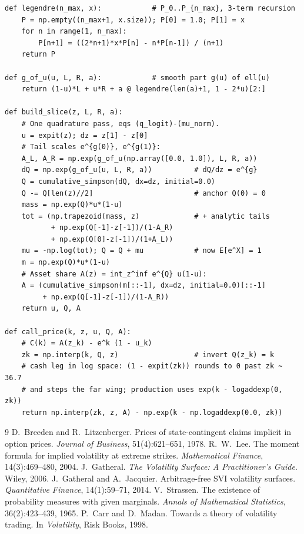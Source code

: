 \documentclass[11pt]{article}
\begin{document}
\begin{lstlisting}[caption={The LQD quadrature pipeline (distilled from
\texttt{models/lqd/\{basis,quadrature\}.py}).}]
def legendre(n_max, x):            # P_0..P_{n_max}, 3-term recursion
    P = np.empty((n_max+1, x.size)); P[0] = 1.0; P[1] = x
    for n in range(1, n_max):
        P[n+1] = ((2*n+1)*x*P[n] - n*P[n-1]) / (n+1)
    return P

def g_of_u(u, L, R, a):            # smooth part g(u) of ell(u)
    return (1-u)*L + u*R + a @ legendre(len(a)+1, 1 - 2*u)[2:]

def build_slice(z, L, R, a):
    # One quadrature pass, eqs (q_logit)-(mu_norm).
    u = expit(z); dz = z[1] - z[0]
    # Tail scales e^{g(0)}, e^{g(1)}:
    A_L, A_R = np.exp(g_of_u(np.array([0.0, 1.0]), L, R, a))
    dQ = np.exp(g_of_u(u, L, R, a))          # dQ/dz = e^{g}
    Q = cumulative_simpson(dQ, dx=dz, initial=0.0)
    Q -= Q[len(z)//2]                        # anchor Q(0) = 0
    mass = np.exp(Q)*u*(1-u)
    tot = (np.trapezoid(mass, z)             # + analytic tails
           + np.exp(Q[-1]-z[-1])/(1-A_R)
           + np.exp(Q[0]-z[-1])/(1+A_L))
    mu = -np.log(tot); Q = Q + mu            # now E[e^X] = 1
    m = np.exp(Q)*u*(1-u)
    # Asset share A(z) = int_z^inf e^{Q} u(1-u):
    A = (cumulative_simpson(m[::-1], dx=dz, initial=0.0)[::-1]
         + np.exp(Q[-1]-z[-1])/(1-A_R))
    return u, Q, A

def call_price(k, z, u, Q, A):
    # C(k) = A(z_k) - e^k (1 - u_k)
    zk = np.interp(k, Q, z)                  # invert Q(z_k) = k
    # cash leg in log space: (1 - expit(zk)) rounds to 0 past zk ~ 36.7
    # and steps the far wing; production uses exp(k - logaddexp(0, zk))
    return np.interp(zk, z, A) - np.exp(k - np.logaddexp(0.0, zk))
\end{lstlisting}

\begin{thebibliography}{9}
 D.~Breeden and R.~Litzenberger.
Prices of state-contingent claims implicit in option prices.
\emph{Journal of Business}, 51(4):621--651, 1978.
 R.~W.~Lee.
The moment formula for implied volatility at extreme strikes.
\emph{Mathematical Finance}, 14(3):469--480, 2004.
 J.~Gatheral.
\emph{The Volatility Surface: A Practitioner's Guide}. Wiley, 2006.
 J.~Gatheral and A.~Jacquier.
Arbitrage-free SVI volatility surfaces.
\emph{Quantitative Finance}, 14(1):59--71, 2014.
 V.~Strassen.
The existence of probability measures with given marginals.
\emph{Annals of Mathematical Statistics}, 36(2):423--439, 1965.
 P.~Carr and D.~Madan.
Towards a theory of volatility trading.
In \emph{Volatility}, Risk Books, 1998.
\end{thebibliography}
\end{document}
